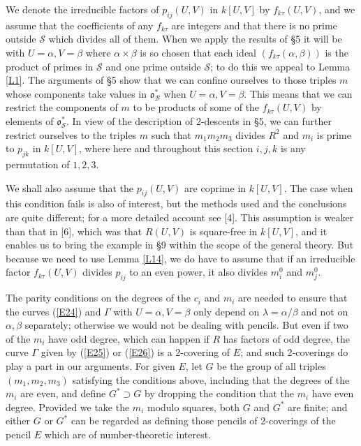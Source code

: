 \documentclass[12pt]{article}
\def\fo{{\mathfrak o}}
\def\ga{{\alpha}}
\def\gb{{\beta}}
\def\gG{{\Gamma}}
\def\gl{{\lambda}}
\def\sB{{\mathcal B}}
\def\sS{{\mathcal S}}
\begin{document}
We denote the irreducible factors of $p_{ij}(U,V)$ in $k[U,V]$
by $f_{k\tau}(U,V)$, and we assume that the coefficients of
any $f_{k\tau}$ are integers and that there is no prime
outside $\sS$ which divides all of them. When we apply the
results of \S5 it will be
with $U=\ga,V=\gb$ where $\ga\times\gb$ is so chosen that each
ideal $(f_{k\tau}(\ga,\gb))$ is the product of primes in $\sS$
and one prime outside $\sS$; to do this we appeal to Lemma
\ref{L1}. The arguments of \S5 show that we
can confine ourselves to those triples $m$ whose components
take values in $\fo^*_\sB$ when $U=\ga,V=\gb$. This means that
we can restrict the components of $m$ to be products of some
of the $f_{k\tau}(U,V)$ by elements of $\fo^*_\sS$. In view of
the description of 2-descents in \S5, we can further restrict
ourselves to the triples $m$ such that $m_1m_2m_3$
divides $R^2$ and $m_i$ is prime to $p_{jk}$ in $k[U,V]$,
where here and throughout this section $i,j,k$ is any
permutation of $1,2,3$.

We shall also assume that the $p_{ij}(U,V)$ are
coprime in $k[U,V]$. The case when
this condition fails is also of interest, but the methods used and the
conclusions are quite different; for a more detailed account see [4].
This assumption is weaker than that in [6], which
was that $R(U,V)$ is square-free in $k[U,V]$, and it enables us to bring the
example in \S9 within the scope of the general theory. But
because we need to use Lemma \ref{L14}, we do have to
assume that if an irreducible factor $f_{k\tau}(U,V)$ divides $p_{ij}$ to an
even power, it also divides $m^0_i$ and $m^0_j$.

The parity conditions on the degrees of the $c_i$ and $m_i$
are needed to ensure that the curves (\ref{E24})
and $\gG$ with $U=\ga,V=\gb$ only depend on
$\gl=\ga/\gb$ and not on $\ga,\gb$ separately; otherwise we
would not be dealing with pencils. But even if two of the
$m_i$ have odd degree, which can happen if $R$ has factors of
odd degree, the curve $\gG$ given by (\ref{E25})
or (\ref{E26}) is a 2-covering of $E$; and such 2-coverings
do play a part in our arguments. For given $E$, let $G$
be the group of all triples $(m_1,m_2,m_3)$ satisfying the
conditions above,
including that the degrees of the $m_i$ are even,
and define $G^*\supset G$ by dropping the condition that the
$m_i$ have even degree. Provided we take the $m_i$ modulo
squares, both $G$ and $G^*$ are finite; and either $G$ or
$G^*$ can be regarded as defining those pencils of
2-coverings of the pencil $E$ which are of
number-theoretic interest.
\end{document}
